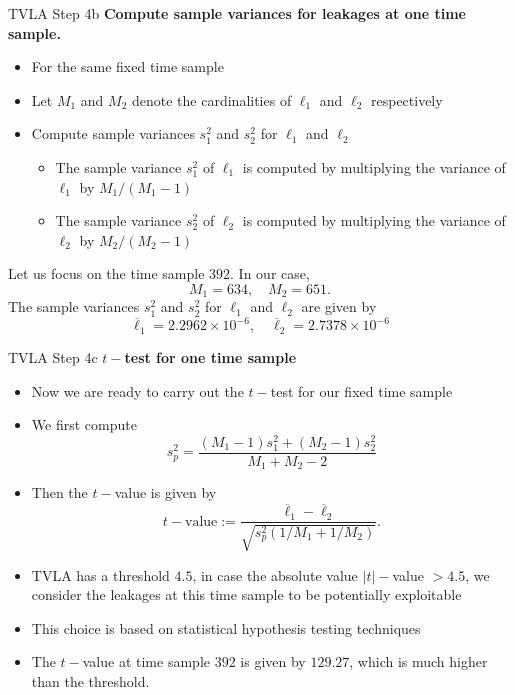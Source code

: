\begin{frame}{TVLA Step 4b}
    \textbf{Compute sample variances for leakages at one time sample.}
    \begin{itemize}
        \item For the same fixed time sample
        \item Let $M_1$ and $M_2$ denote the cardinalities of $\ell_1$ and $\ell_2$ respectively 
        \item Compute sample variances $s_1^2$ and $s_2^2$ for $\ell_1$ and $\ell_2$
        \begin{itemize}
            \item The sample variance $s_1^2$ of $\ell_1$ is computed by multiplying the variance of $\ell_1$ by $M_1/(M_1-1)$
            \item The sample variance $s_2^2$ of $\ell_2$ is computed by multiplying the variance of $\ell_2$ by $M_2/(M_2-1)$
        \end{itemize}
    \end{itemize}
    \begin{example}
        Let us focus on the time sample $392$.
        In our case,
        \[
        M_1=634,\quad M_2=651.
        \]
        The sample variances $s_1^2$ and $s_2^2$ for $\ell_1$ and $\ell_2$ are given by
        \[
        \overline{\ell}_1 = 2.2962\times10^{-6},\quad \overline{\ell}_2=2.7378\times10^{-6}
        \]
    \end{example}
\end{frame}

\begin{frame}{TVLA Step 4c}
    \textbf{$t-$test for one time sample}
    \begin{itemize}
        \item Now we are ready to carry out the $t-$test for our fixed time sample
        \item We first compute
        \[
        s_p^2=\frac{(M_1-1)s_1^{2}+(M_2-1)s_2^{2}}{M_1+M_2-2}
        \]
        \item Then the $t-$value is given by
        \[
        t-\text{value}:=\frac{\overline{\ell}_1-\overline{\ell}_2}{\sqrt{s_p^2(1/M_1+1/M_2)}}.
        \]
        \item TVLA has a threshold $4.5$, in case the absolute value $|t|-$value $>4.5$, we consider the leakages at this time sample to be potentially exploitable
        \item This choice is based on statistical hypothesis testing techniques
    \end{itemize}
    \begin{example}
    \begin{itemize}
        \item The $t-$value at time sample $392$ is given by $129.27$, which is much higher than the threshold.
    \end{itemize}
    \end{example}
\end{frame}

